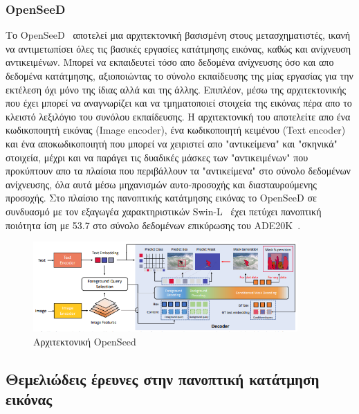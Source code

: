 \documentclass[12pt]{article}
\numberwithin{equation}{section}
\begin{document}
\subsubsection{OpenSeeD}

Το OpenSeeD~\cite{zhang2023simpleframeworkopenvocabularysegmentation} αποτελεί μια αρχιτεκτονική βασισμένη στους μετασχηματιστές, ικανή να αντιμετωπίσει όλες τις βασικές εργασίες κατάτμησης εικόνας, καθώς και ανίχνευση αντικειμένων. Μπορεί να εκπαιδευτεί τόσο απο δεδομένα ανίχνευσης όσο και απο δεδομένα κατάτμησης, αξιοποιώντας το σύνολο εκπαίδευσης της μίας εργασίας για την εκτέλεση όχι μόνο της ίδιας αλλά και της άλλης. Επιπλέον, μέσω της αρχιτεκτονικής που έχει μπορεί να αναγνωρίζει και να τμηματοποιεί στοιχεία της εικόνας πέρα απο το κλειστό λεξιλόγιο του συνόλου εκπαίδευσης. Η αρχιτεκτονική του αποτελείτε απο ένα κωδικοποιητή εικόνας (Image encoder), ένα κωδικοποιητή κειμένου (Text encoder) και ένα αποκωδικοποιητή που μπορεί να χειριστεί απο "αντικείμενα" και "σκηνικά" στοιχεία, μέχρι και να παράγει τις δυαδικές μάσκες των "αντικειμένων" που προκύπτουν απο τα πλαίσια που περιβάλλουν τα "αντικείμενα" στο σύνολο δεδομένων ανίχνευσης, όλα αυτά μέσω μηχανισμών αυτο-προσοχής και διασταυρούμενης προσοχής. Στο πλαίσιο της πανοπτικής κατάτμησης εικόνας το OpenSeeD σε συνδυασμό με τον εξαγωγέα χαρακτηριστικών Swin-L~\cite{liu2021swintransformerhierarchicalvision} έχει πετύχει πανοπτική ποιότητα ίση με 53.7 στο σύνολο δεδομένων επικύρωσης του ADE20K~\cite{zhou2018semanticunderstandingscenesade20k}.  \\

\begin{figure}[h!]
  \centering
  \includegraphics[width=0.9\textwidth]{images/OpenSeed.png} %
  \caption{Αρχιτεκτονική OpenSeed}
  \label{figure 20}
\end{figure} 

\subsection{Θεμελιώδεις έρευνες στην πανοπτική κατάτμηση εικόνας}
\end{document}
